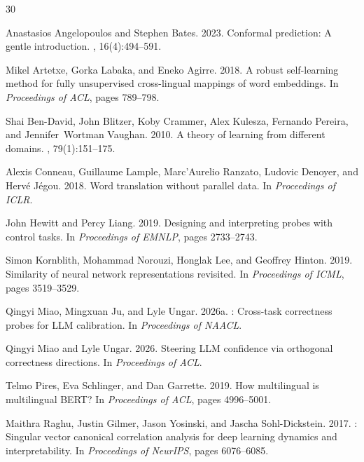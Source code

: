 \documentclass[11pt,a4paper]{article}
\begin{document}
\begin{thebibliography}{30}

Anastasios Angelopoulos and Stephen Bates. 2023.
\newblock Conformal prediction: A gentle introduction.
, 16(4):494--591.

Mikel Artetxe, Gorka Labaka, and Eneko Agirre. 2018.
\newblock A robust self-learning method for fully unsupervised cross-lingual mappings of word embeddings.
\newblock In {\em Proceedings of ACL}, pages 789--798.

Shai Ben-David, John Blitzer, Koby Crammer, Alex Kulesza, Fernando Pereira, and Jennifer~Wortman Vaughan. 2010.
\newblock A theory of learning from different domains.
, 79(1):151--175.

Alexis Conneau, Guillaume Lample, Marc'Aurelio Ranzato, Ludovic Denoyer, and Herv{\'e} J{\'e}gou. 2018.
\newblock Word translation without parallel data.
\newblock In {\em Proceedings of ICLR}.

John Hewitt and Percy Liang. 2019.
\newblock Designing and interpreting probes with control tasks.
\newblock In {\em Proceedings of EMNLP}, pages 2733--2743.

Simon Kornblith, Mohammad Norouzi, Honglak Lee, and Geoffrey Hinton. 2019.
\newblock Similarity of neural network representations revisited.
\newblock In {\em Proceedings of ICML}, pages 3519--3529.

Qingyi Miao, Mingxuan Ju, and Lyle Ungar. 2026a.
: Cross-task correctness probes for LLM calibration.
\newblock In {\em Proceedings of NAACL}.

Qingyi Miao and Lyle Ungar. 2026.
\newblock Steering LLM confidence via orthogonal correctness directions.
\newblock In {\em Proceedings of ACL}.

Telmo Pires, Eva Schlinger, and Dan Garrette. 2019.
\newblock How multilingual is multilingual {BERT}?
\newblock In {\em Proceedings of ACL}, pages 4996--5001.

Maithra Raghu, Justin Gilmer, Jason Yosinski, and Jascha Sohl-Dickstein. 2017.
: Singular vector canonical correlation analysis for deep learning dynamics and interpretability.
\newblock In {\em Proceedings of NeurIPS}, pages 6076--6085.


\end{thebibliography}
\end{document}
